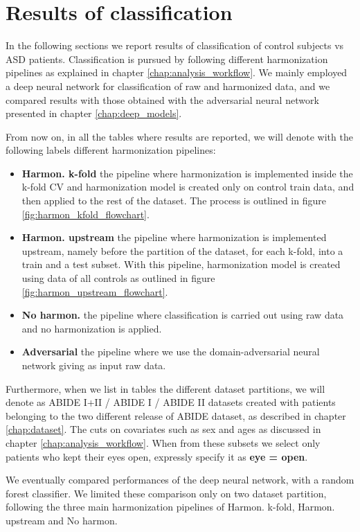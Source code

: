 \documentclass[11pt]{report}
\begin{document}
\newpage
\chapter{Results of classification} \label{chap:results_deeplearning}
In the following sections we report results of classification of control subjects vs ASD patients.
Classification is pursued by following different harmonization pipelines as explained in chapter \ref{chap:analysis_workflow}.
We mainly employed a deep neural network for classification of raw and harmonized data, and we compared results with those obtained with the adversarial neural network presented in chapter \ref{chap:deep_models}.

From now on, in all the tables where results are reported, we will denote with the following labels different harmonization pipelines:

\begin{itemize}
 \item \textbf{Harmon. k-fold} the pipeline where harmonization is implemented inside the k-fold CV and harmonization model is created only on control train data, and then applied to the rest of the dataset. The process is outlined in figure \ref{fig:harmon_kfold_flowchart}. 
 \item \textbf{Harmon. upstream} the pipeline where harmonization is implemented upstream, namely before the partition of the dataset, for each k-fold, into a train and a test subset. With this pipeline, harmonization model is created using data of all controls as outlined in figure \ref{fig:harmon_upstream_flowchart}. 
 \item \textbf{No harmon.} the pipeline where classification is carried out using raw data and no harmonization is applied. 
 \item \textbf{Adversarial} the pipeline where we use the domain-adversarial neural network giving as input raw data.
\end{itemize}

Furthermore, when we list in tables the different dataset partitions, we will denote as ABIDE I+II / ABIDE I / ABIDE II datasets created with patients belonging to the two different release of ABIDE dataset, as described in chapter \ref{chap:dataset}.
The cuts on covariates such as sex and ages as discussed in chapter \ref{chap:analysis_workflow}.
When from these subsets we select only patients who kept their eyes open, expressly specify it as \textbf{eye = open}.

We eventually compared performances of the deep neural network, with a random forest classifier.
We limited these comparison only on two dataset partition, following the three main harmonization pipelines of Harmon. k-fold, Harmon. upstream and No harmon.  
\end{document}

